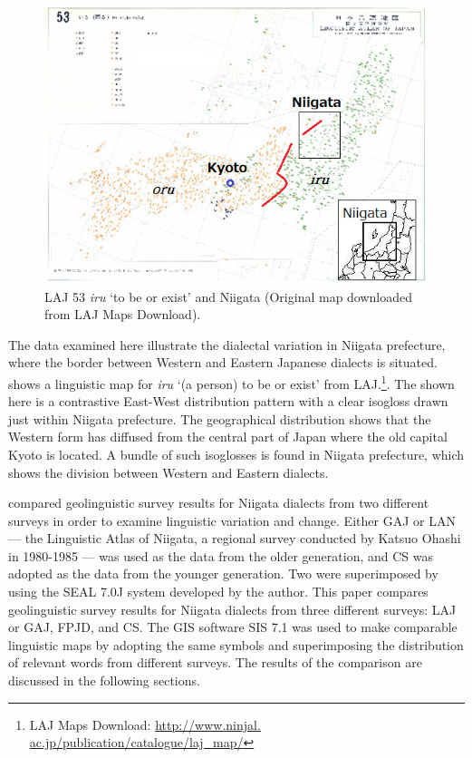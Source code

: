 \documentclass[output=paper]{LSP/langsci}
\begin{document}
\begin{figure}
\includegraphics[width=1\textwidth]{illustrations/fuku2_fig1}
\caption{\textsc{LAJ} 53 \textit{iru} `to be or exist' and Niigata (Original map downloaded from \textsc{LAJ} Maps Download).}
\label{fig:1}
\end{figure}

The data examined here illustrate the dialectal variation in Niigata prefecture, where the border between Western and Eastern Japanese dialects is situated.  shows a linguistic map for \textit{iru} `(a person) to be or exist' from \textsc{LAJ}.\footnote{\textsc{LAJ} Maps Download: \url{http://www.ninjal. ac.jp/publication/catalogue/laj\_map/}}.  The  shown here is a contrastive East-West distribution pattern with a clear isogloss drawn just within Niigata prefecture.  The geographical distribution shows that the Western form has diffused from the central part of Japan where the old capital Kyoto is located.  A bundle of such isoglosses is found in Niigata prefecture, which shows the division between Western and Eastern dialects.

\largerpage
\citet{fukushima_superimposing_2007} compared geolinguistic survey results for Niigata dialects from two different surveys in order to examine linguistic variation and change.  Either \textsc{GAJ} or LAN --- the Linguistic Atlas of Niigata, a regional survey conducted by Katsuo Ohashi in 1980-1985 \citep{ohashi_linguistic_1998} --- was used as the data from the older generation, and \textsc{CS} was adopted as the data from the younger generation.  Two  were superimposed by using the SEAL 7.0J system developed by the author.  This paper compares geolinguistic survey results for Niigata dialects from three different surveys: \textsc{LAJ} or \textsc{GAJ}, \textsc{FPJD}, and \textsc{CS}.  The \textsc{GIS} software SIS 7.1 was used to make comparable linguistic maps by adopting the same symbols and superimposing the distribution of relevant words from different surveys.  The results of the comparison are discussed in the following sections.
\end{document}

